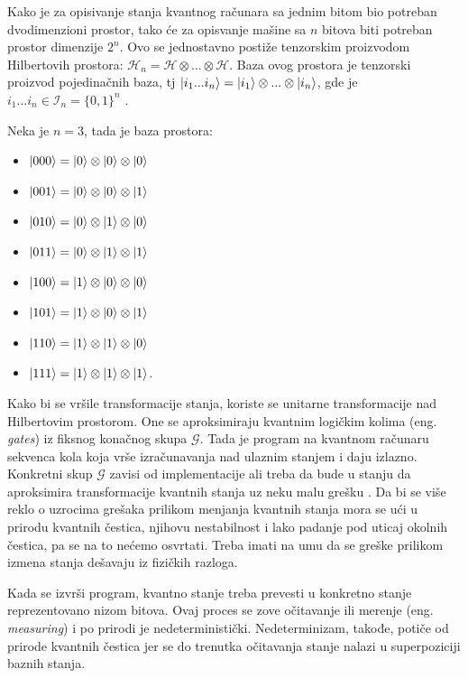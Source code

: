 Kako je za opisivanje stanja kvantnog računara sa jednim bitom bio potreban dvodimenzioni prostor, tako će za opisvanje mašine sa $n$ bitova biti potreban prostor dimenzije $2^n$. Ovo se jednostavno postiže tenzorskim proizvodom Hilbertovih prostora: $\mathcal{H}_n = \mathcal{H} \otimes ... \otimes \mathcal{H}$. Baza ovog prostora je tenzorski proizvod pojedinačnih baza, tj $ | i_1...i_n \rangle = | i_1 \rangle \otimes ... \otimes  | i_n \rangle $, gde je $i_1...i_n \in \mathcal{I}_n = \{0,1\}^n$ \cite{postquantumcryptography:2009}.

\begin{example}
    Neka je $n=3$, tada je baza prostora:
    \begin{itemize}
        \item[] $| 000 \rangle = | 0 \rangle \otimes | 0 \rangle \otimes | 0 \rangle$
        \item[] $| 001 \rangle = | 0 \rangle \otimes | 0 \rangle \otimes | 1 \rangle$
        \item[] $| 010 \rangle = | 0 \rangle \otimes | 1 \rangle \otimes | 0 \rangle$
        \item[] $| 011 \rangle = | 0 \rangle \otimes | 1 \rangle \otimes | 1 \rangle$
        \item[] $| 100 \rangle = | 1 \rangle \otimes | 0 \rangle \otimes | 0 \rangle$
        \item[] $| 101 \rangle = | 1 \rangle \otimes | 0 \rangle \otimes | 1 \rangle$
        \item[] $| 110 \rangle = | 1 \rangle \otimes | 1 \rangle \otimes | 0 \rangle$
        \item[] $| 111 \rangle = | 1 \rangle \otimes | 1 \rangle \otimes | 1 \rangle$.
    \end{itemize}
\end{example}

Kako bi se vršile transformacije stanja, koriste se unitarne transformacije nad Hilbertovim prostorom. One se aproksimiraju kvantnim logičkim kolima (eng. \textit{gates}) iz fiksnog konačnog skupa $\mathcal{G}$. Tada je program na kvantnom računaru sekvenca kola koja vrše izračunavanja nad ulaznim stanjem i daju izlazno. Konkretni skup $\mathcal{G}$ zavisi od implementacije ali treba da bude u stanju da aproksimira transformacije kvantnih stanja uz neku malu grešku \cite{postquantumcryptography:2009}. Da bi se više reklo o uzrocima grešaka prilikom menjanja kvantnih stanja mora se ući u prirodu kvantnih čestica, njihovu nestabilnost i lako padanje pod uticaj okolnih čestica, pa se na to nećemo osvrtati. Treba imati na umu da se greške prilikom izmena stanja dešavaju iz fizičkih razloga.

Kada se izvrši program, kvantno stanje treba prevesti u konkretno stanje reprezentovano nizom bitova. Ovaj proces se zove očitavanje ili merenje (eng. \textit{measuring}) i po prirodi je nedeterministički. Nedeterminizam, takođe, potiče od prirode kvantnih čestica jer se do trenutka očitavanja stanje nalazi u superpoziciji baznih stanja.


